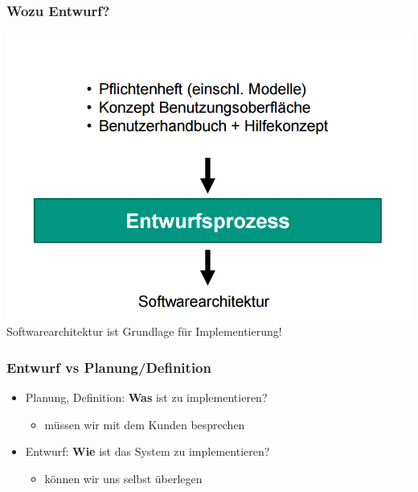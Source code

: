 \documentclass[18pt]{beamer}
\begin{document}
		\begin{frame}
			\frametitle{Wozu Entwurf?}
			\centering
			\includegraphics[scale=0.4]{./pics/tut3/design.png} \linebreak
			Softwarearchitektur ist Grundlage für Implementierung!
		\end{frame}
	
		\begin{frame}
			\frametitle{Entwurf vs Planung/Definition}
			\begin{itemize}
				\item Planung, Definition: \textbf{Was} ist zu implementieren?
				\begin{itemize}
					\item müssen wir mit dem Kunden besprechen
				\end{itemize}
				\pause
				\item Entwurf: \textbf{Wie} ist das System zu implementieren?
				\begin{itemize}
					\item können wir uns selbst überlegen
				\end{itemize}
			\end{itemize}
		\end{frame}
	
\end{document}
